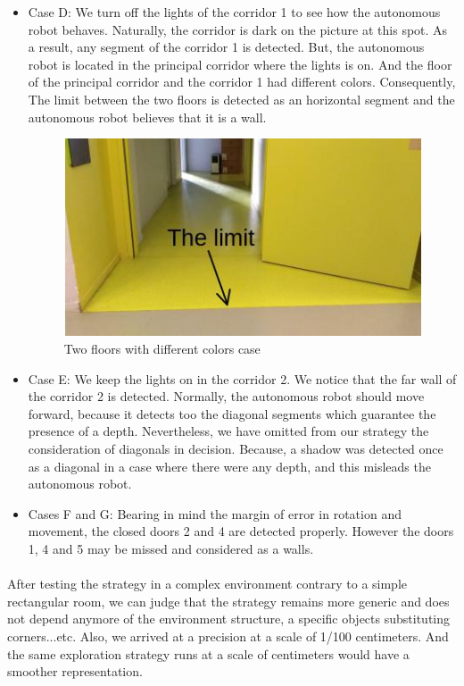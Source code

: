 \documentclass[12pt]{report}
\begin{document}
\begin{itemize}
		\item Case D: We turn off the lights of the corridor 1 to see how the autonomous robot behaves. Naturally, the corridor is dark on the picture at this spot. As a result, any segment of the corridor 1 is detected. But, the autonomous robot is located in the principal corridor where the lights is on. And the floor of the principal corridor and the corridor 1 had different colors. Consequently, The limit between the two floors is detected as an horizontal segment and the autonomous robot believes that it is a wall.
		\begin{figure}[H]
			\begin{center}
				\includegraphics[scale=0.80]{res/limit_cor.jpg}
				\caption{Two floors with different colors case}
			\end{center}
		\end{figure}
	\item Case E: We keep the lights on in the corridor 2. We notice that the far wall of the corridor 2 is detected. Normally, the autonomous robot should move forward, because it detects too the diagonal segments which guarantee the presence of a depth. Nevertheless, we have omitted from our strategy the consideration of diagonals in decision. Because, a shadow was detected once as a diagonal in a case where there were any depth, and this misleads the autonomous robot.
	
	\item Cases F and G: Bearing in mind the margin of error in rotation and movement, the closed doors 2 and 4 are detected properly. However the doors 1, 4 and 5 may be missed and considered as a walls.
	\end{itemize}

	\paragraph{}
	After testing the strategy in a complex environment contrary to a simple rectangular room, we can judge that the strategy remains more generic and does not depend anymore of the environment structure, a specific objects substituting corners...etc. Also, we arrived at a precision at a scale of 1/100 centimeters. And the same exploration strategy runs at a scale of centimeters would have a smoother representation.
\end{document}
